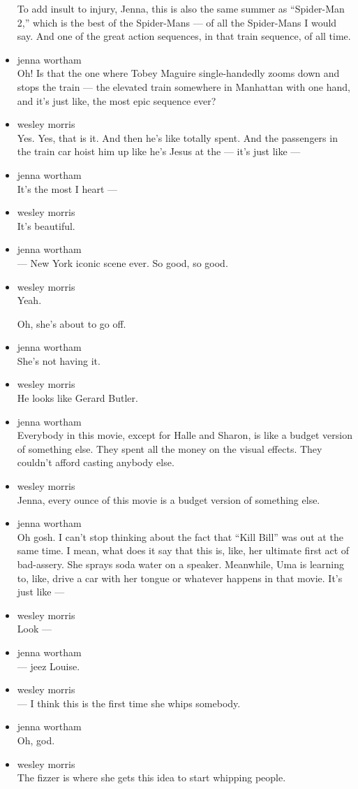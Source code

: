 \begin{itemize}
  To add insult to injury, Jenna, this is also the same summer as
  ``Spider-Man 2,'' which is the best of the Spider-Mans --- of all the
  Spider-Mans I would say. And one of the great action sequences, in
  that train sequence, of all time.
\item
  jenna wortham\\
  Oh! Is that the one where Tobey Maguire single-handedly zooms down and
  stops the train --- the elevated train somewhere in Manhattan with one
  hand, and it's just like, the most epic sequence ever?
\item
  wesley morris\\
  Yes. Yes, that is it. And then he's like totally spent. And the
  passengers in the train car hoist him up like he's Jesus at the ---
  it's just like ---
\item
  jenna wortham\\
  It's the most I heart ---
\item
  wesley morris\\
  It's beautiful.
\item
  jenna wortham\\
  --- New York iconic scene ever. So good, so good.
\item
  wesley morris\\
  Yeah.

  Oh, she's about to go off.
\item
  jenna wortham\\
  She's not having it.
\item
  wesley morris\\
  He looks like Gerard Butler.
\item
  jenna wortham\\
  Everybody in this movie, except for Halle and Sharon, is like a budget
  version of something else. They spent all the money on the visual
  effects. They couldn't afford casting anybody else.
\item
  wesley morris\\
  Jenna, every ounce of this movie is a budget version of something
  else.
\item
  jenna wortham\\
  Oh gosh. I can't stop thinking about the fact that ``Kill Bill'' was
  out at the same time. I mean, what does it say that this is, like, her
  ultimate first act of bad-assery. She sprays soda water on a speaker.
  Meanwhile, Uma is learning to, like, drive a car with her tongue or
  whatever happens in that movie. It's just like ---
\item
  wesley morris\\
  Look ---
\item
  jenna wortham\\
  --- jeez Louise.
\item
  wesley morris\\
  --- I think this is the first time she whips somebody.
\item
  jenna wortham\\
  Oh, god.
\item
  wesley morris\\
  The fizzer is where she gets this idea to start whipping people.


\end{itemize}
